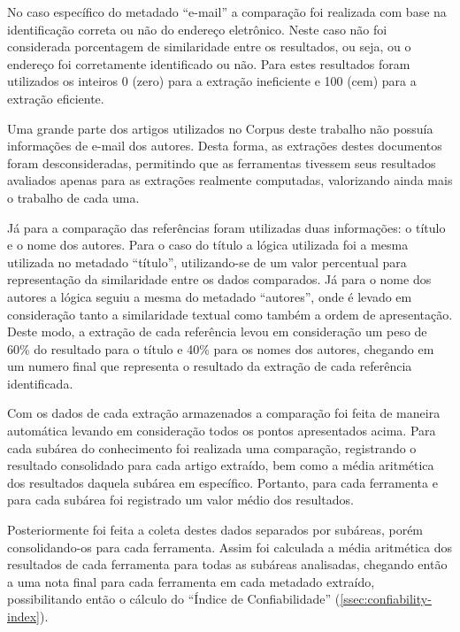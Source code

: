No caso específico do metadado ``e-mail'' a comparação foi realizada com base na identificação correta ou não do endereço eletrônico. Neste caso não foi considerada porcentagem de similaridade entre os resultados, ou seja, ou o endereço foi corretamente identificado ou não. Para estes resultados foram utilizados os inteiros 0 (zero) para a extração ineficiente e 100 (cem) para a extração eficiente.


Uma grande parte dos artigos utilizados no Corpus deste trabalho não possuía informações de e-mail dos autores. Desta forma, as extrações destes documentos foram desconsideradas, permitindo que as ferramentas tivessem seus resultados avaliados apenas para as extrações realmente computadas, valorizando ainda mais o trabalho de cada uma.


Já para a comparação das referências foram utilizadas duas informações: o título e o nome dos autores. Para o caso do título a lógica utilizada foi a mesma utilizada no metadado ``título'', utilizando-se de um valor percentual para representação da similaridade entre os dados comparados. Já para o nome dos autores a lógica seguiu a mesma do metadado ``autores'', onde é levado em consideração tanto a similaridade textual como também a ordem de apresentação. Deste modo, a extração de cada referência levou em consideração um peso de 60\% do resultado para o título e 40\% para os nomes dos autores, chegando em um numero final que representa o resultado da extração de cada referência identificada.


Com os dados de cada extração armazenados a comparação foi feita de maneira automática levando em consideração todos os pontos apresentados acima. Para cada subárea do conhecimento foi realizada uma comparação, registrando o resultado consolidado para cada artigo extraído, bem como a média aritmética dos resultados daquela subárea em específico. Portanto, para cada ferramenta e para cada subárea foi registrado um valor médio dos resultados.

Posteriormente foi feita a coleta destes dados separados por subáreas, porém consolidando-os para cada ferramenta. Assim foi calculada a média aritmética dos resultados de cada ferramenta para todas as subáreas analisadas, chegando então a uma nota final para cada ferramenta em cada metadado extraído, possibilitando então o cálculo do ``Índice de Confiabilidade'' (\autoref{ssec:confiability-index}).


